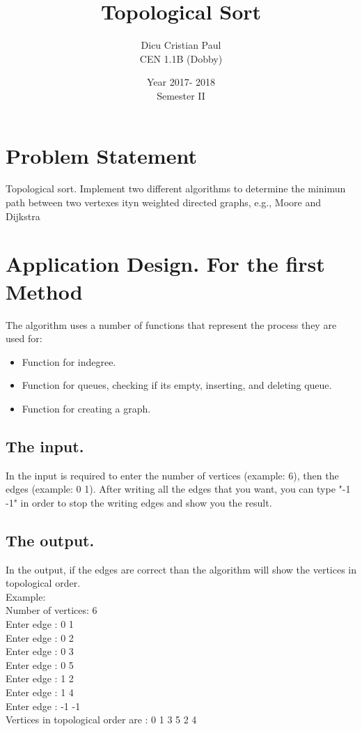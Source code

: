 \documentclass{report}
\title{Topological Sort}
\author{Dicu Cristian Paul \\ CEN 1.1B (Dobby)}
\date{Year 2017- 2018 \\ Semester II}
\begin{document}
\maketitle

\chapter*{Problem Statement}
Topological sort. Implement two different algorithms to determine the minimun path between two vertexes ityn weighted directed graphs, e.g., Moore and Dijkstra


\chapter*{Application Design. For the first Method}
The algorithm uses a number of functions that represent the process they are used for: 
\begin{itemize}
    \item Function for indegree.
    \item Function for queues, checking if its empty, inserting, and deleting queue.
    \item Function for creating a graph.
\end {itemize}
\section*{The input.}
In the input is required to enter the number of vertices (example: 6), then the edges (example: 0 1). After writing  all the edges that you want, you can type "-1 -1" in order to stop the writing edges and show you the result.
\section*{The output.}
In the output, if the edges are correct than the algorithm will show the vertices in topological order.
\\Example:
\\Number of vertices: 6
\\Enter edge : 0 1
\\Enter edge : 0 2
\\Enter edge : 0 3
\\Enter edge : 0 5
\\Enter edge : 1 2
\\Enter edge : 1 4 
\\Enter edge : -1 -1
\\Vertices in topological order are : 0 1 3 5 2 4
\end{document}
